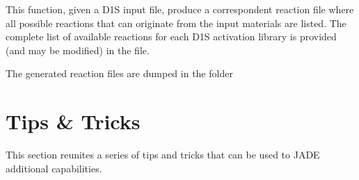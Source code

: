 \documentclass[letterpaper,10pt,english]{sphinxmanual}
\begin{document}
\sphinxAtStartPar
This function, given a D1S input file, produce a correspondent reaction file
where all possible reactions that can originate from the input materials are
listed. The complete list of available reactions for each D1S activation
library is provided (and may be modified) in the 
file.

\sphinxAtStartPar
The generated reaction files are dumped in the  folder


\chapter{Tips \& Tricks}
\label{\detokenize{usage/tipstricks:tips-tricks}}\label{\detokenize{usage/tipstricks::doc}}
\sphinxAtStartPar
This section reunites a series of tips and tricks that can be used to 
JADE additional capabilities.
\end{document}
